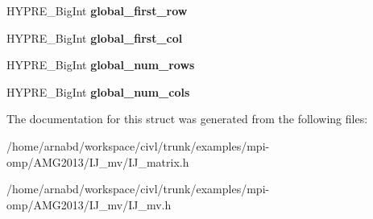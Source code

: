 \begin{DoxyCompactItemize}
\item 
\hypertarget{structhypre__IJMatrix__struct_a5f7c0f174d7ed9180ecdc86be7879cbf}{}H\+Y\+P\+R\+E\+\_\+\+Big\+Int {\bfseries global\+\_\+first\+\_\+row}\label{structhypre__IJMatrix__struct_a5f7c0f174d7ed9180ecdc86be7879cbf}

\item 
\hypertarget{structhypre__IJMatrix__struct_a9e7b991723a9247bb7eca94d60985254}{}H\+Y\+P\+R\+E\+\_\+\+Big\+Int {\bfseries global\+\_\+first\+\_\+col}\label{structhypre__IJMatrix__struct_a9e7b991723a9247bb7eca94d60985254}

\item 
\hypertarget{structhypre__IJMatrix__struct_a4b1239df41ea3b168aa1ee606eccee7c}{}H\+Y\+P\+R\+E\+\_\+\+Big\+Int {\bfseries global\+\_\+num\+\_\+rows}\label{structhypre__IJMatrix__struct_a4b1239df41ea3b168aa1ee606eccee7c}

\item 
\hypertarget{structhypre__IJMatrix__struct_a9dc2854f30efbe63fcea6695a022c9eb}{}H\+Y\+P\+R\+E\+\_\+\+Big\+Int {\bfseries global\+\_\+num\+\_\+cols}\label{structhypre__IJMatrix__struct_a9dc2854f30efbe63fcea6695a022c9eb}

\end{DoxyCompactItemize}


The documentation for this struct was generated from the following files\+:\begin{DoxyCompactItemize}
\item 
/home/arnabd/workspace/civl/trunk/examples/mpi-\/omp/\+A\+M\+G2013/\+I\+J\+\_\+mv/I\+J\+\_\+matrix.\+h\item 
/home/arnabd/workspace/civl/trunk/examples/mpi-\/omp/\+A\+M\+G2013/\+I\+J\+\_\+mv/I\+J\+\_\+mv.\+h\end{DoxyCompactItemize}

